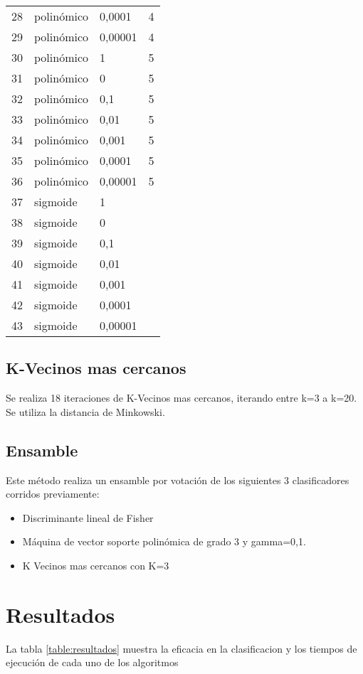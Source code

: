\documentclass[journal]{IEEEtran}
\begin{document}
\begin{table}[ht!]
\begin{tabular}{l | l l l }
28 & polinómico & 0,0001  & 4 \\ 
29 & polinómico & 0,00001  & 4 \\ 
30 & polinómico & 1  & 5 \\ 
31 & polinómico & 0  & 5 \\ 
32 & polinómico & 0,1  & 5 \\ 
33 & polinómico & 0,01  & 5 \\ 
34 & polinómico & 0,001  & 5 \\ 
35 & polinómico & 0,0001  & 5 \\ 
36 & polinómico & 0,00001  & 5 \\ 
37 & sigmoide & 1 &  \\ 
38 & sigmoide & 0 &  \\ 
39 & sigmoide & 0,1 &  \\ 
40 & sigmoide & 0,01 &  \\ 
41 & sigmoide & 0,001 &  \\ 
42 & sigmoide & 0,0001 &  \\ 
43 & sigmoide & 0,00001 &  \\ 
\end{tabular}
\end{table}

\subsection{K-Vecinos mas cercanos}
Se realiza 18 iteraciones de K-Vecinos mas cercanos, iterando entre k=3
a k=20. Se utiliza la distancia de Minkowski.

\subsection{Ensamble}
Este método realiza un ensamble por votación de los siguientes 3
clasificadores corridos previamente:

\begin{itemize}
\item Discriminante lineal de Fisher
\item Máquina de vector soporte polinómica de grado 3 y gamma=0,1. 
\item K Vecinos mas cercanos con K=3
\end{itemize}

\section{Resultados}

La tabla \ref{table:resultados} muestra la eficacia en la clasificacion
y los tiempos de ejecución de cada uno de los algoritmos 
\end{document}
